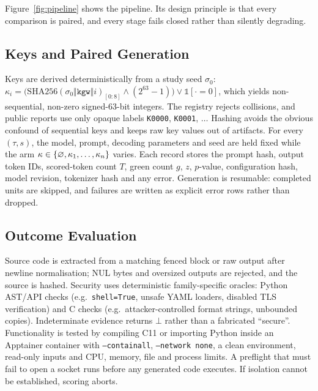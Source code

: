 Figure~\ref{fig:pipeline} shows the pipeline. Its design principle is that every comparison is paired, and every stage fails closed rather than silently degrading.

\subsection{Keys and Paired Generation}
Keys are derived deterministically from a study seed $\sigma_0$: $\kappa_i=\big(\mathrm{SHA256}(\sigma_0\Vert\texttt{kgw}\Vert i)_{[0:8]}\wedge(2^{63}-1)\big)\vee\mathbb{1}[\cdot=0]$, which yields non-sequential, non-zero signed-63-bit integers. The registry rejects collisions, and public reports use only opaque labels \texttt{K0000}, \texttt{K0001}, $\ldots$ Hashing avoids the obvious confound of sequential keys and keeps raw key values out of artifacts. For every $(\tau,s)$, the model, prompt, decoding parameters and seed are held fixed while the arm $\kappa\in\{\varnothing,\kappa_1,\ldots,\kappa_n\}$ varies. Each record stores the prompt hash, output token IDs, scored-token count $T$, green count $g$, $z$, $p$-value, configuration hash, model revision, tokenizer hash and any error. Generation is resumable: completed units are skipped, and failures are written as explicit error rows rather than dropped.

\subsection{Outcome Evaluation}
Source code is extracted from a matching fenced block or raw output after newline normalisation; NUL bytes and oversized outputs are rejected, and the source is hashed. Security uses deterministic family-specific oracles: Python AST/API checks (e.g.\ \texttt{shell=True}, unsafe YAML loaders, disabled TLS verification) and C checks (e.g.\ attacker-controlled format strings, unbounded copies). Indeterminate evidence returns $\bot$ rather than a fabricated ``secure''. Functionality is tested by compiling C11 or importing Python inside an Apptainer container with \texttt{--containall}, \texttt{--network none}, a clean environment, read-only inputs and CPU, memory, file and process limits. A preflight that must fail to open a socket runs before any generated code executes. If isolation cannot be established, scoring aborts.

